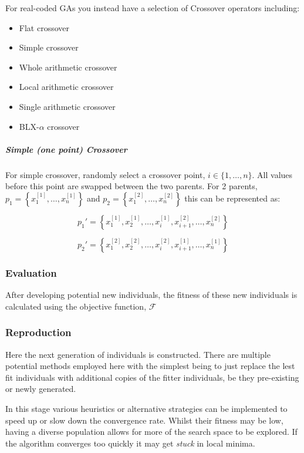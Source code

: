 For real-coded GAs you instead have a selection of Crossover operators including:

\begin{itemize}
    \item Flat crossover
    \item Simple crossover
    \item Whole arithmetic crossover
    \item Local arithmetic crossover
    \item Single arithmetic crossover
    \item BLX-$\alpha$ crossover
\end{itemize}


\subparagraph{Simple (one point) Crossover}\label{imp:SimpCross}

For simple crossover, randomly select a crossover point, $i \in \{1,\ldots,n \}$. All values before this point are swapped between the two parents. For 2 parents, $p_1 = \left\{ x_1^{[1]},\ldots,x_n^{[1]}\right\}$ and $p_2 = \left\{ x_1^{[2]},\ldots,x_n^{[2]}\right\}$ this can be represented as:

\begin{equation}
    p_1' = \left\{ x_1^{[1]},x_2^{[1]}, \ldots, x_i^{[1]}, x_{i+1}^{[2]},\ldots, x_n^{[2]} \right\} 
\end{equation}

\begin{equation}
    p_2' = \left\{ x_1^{[2]},x_2^{[2]}, \ldots, x_i^{[2]}, x_{i+1}^{[1]},\ldots, x_n^{[1]} \right\}
\end{equation}

\subsubsection{Evaluation}
After developing potential new individuals, the fitness of these new individuals is calculated using the objective function, $\mathcal{F}$

\subsubsection{Reproduction}
Here the next generation of individuals is constructed. There are multiple potential methods employed here with the simplest being to just replace the lest fit individuals with additional copies of the fitter individuals, be they pre-existing or newly generated.

In this stage various heuristics or alternative strategies can be implemented to speed up or slow down the convergence rate. Whilst their fitness may be low, having a diverse population allows for more of the search space to be explored. If the algorithm converges too quickly it may get \textit{stuck} in local minima. 


